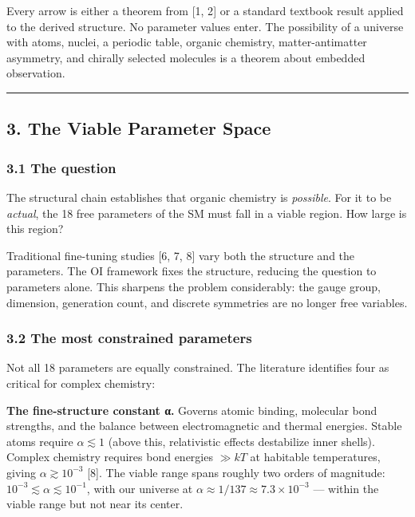 \documentclass[
]{article}
\begin{document}
Every arrow is either a theorem from {[}1, 2{]} or a standard textbook
result applied to the derived structure. No parameter values enter. The
possibility of a universe with atoms, nuclei, a periodic table, organic
chemistry, matter-antimatter asymmetry, and chirally selected molecules
is a theorem about embedded observation.

\begin{center}\rule{0.5\linewidth}{0.5pt}\end{center}

\hypertarget{the-viable-parameter-space}{%
\subsection{3. The Viable Parameter
Space}\label{the-viable-parameter-space}}

\hypertarget{the-question}{%
\subsubsection{3.1 The question}\label{the-question}}

The structural chain establishes that organic chemistry is
\emph{possible}. For it to be \emph{actual}, the 18 free parameters of
the SM must fall in a viable region. How large is this region?

Traditional fine-tuning studies {[}6, 7, 8{]} vary both the structure
and the parameters. The OI framework fixes the structure, reducing the
question to parameters alone. This sharpens the problem considerably:
the gauge group, dimension, generation count, and discrete symmetries
are no longer free variables.

\hypertarget{the-most-constrained-parameters}{%
\subsubsection{3.2 The most constrained
parameters}\label{the-most-constrained-parameters}}

Not all 18 parameters are equally constrained. The literature identifies
four as critical for complex chemistry:

\textbf{The fine-structure constant α.} Governs atomic binding,
molecular bond strengths, and the balance between electromagnetic and
thermal energies. Stable atoms require \(\alpha \lesssim 1\) (above
this, relativistic effects destabilize inner shells). Complex chemistry
requires bond energies \(\gg kT\) at habitable temperatures, giving
\(\alpha \gtrsim 10^{-3}\) {[}8{]}. The viable range spans roughly two
orders of magnitude: \(10^{-3} \lesssim \alpha \lesssim 10^{-1}\), with
our universe at \(\alpha \approx 1/137 \approx 7.3 \times 10^{-3}\) ---
within the viable range but not near its center.
\end{document}

